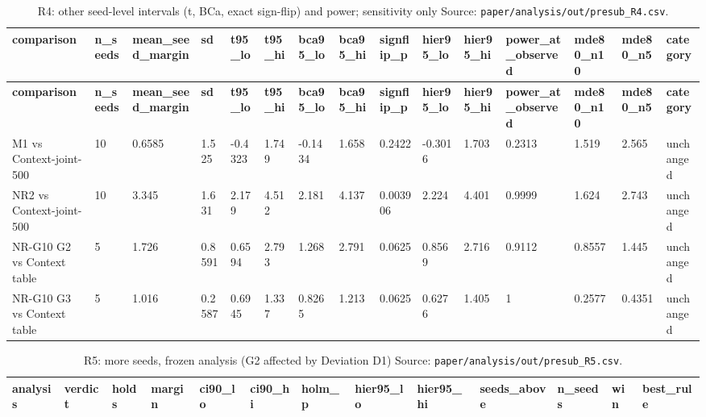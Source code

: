 \documentclass[10pt]{article}
\begin{document}
\begin{landscape}
\begin{longtable}{@{}llllllllllllll@{}}
\bottomrule
\end{longtable}
\normalsize
\tiny
\setlength{\tabcolsep}{2pt}
\begin{longtable}{@{}lllllllllllllll@{}}
\caption{R4: other seed-level intervals (t, BCa, exact sign-flip) and power; sensitivity only Source: \texttt{paper/analysis/out/presub\_R4.csv}.}\\
\toprule
\textbf{comparison} & \textbf{n\_seeds} & \textbf{mean\_seed\_margin} & \textbf{sd} & \textbf{t95\_lo} & \textbf{t95\_hi} & \textbf{bca95\_lo} & \textbf{bca95\_hi} & \textbf{signflip\_p} & \textbf{hier95\_lo} & \textbf{hier95\_hi} & \textbf{power\_at\_observed} & \textbf{mde80\_n10} & \textbf{mde80\_n5} & \textbf{category} \\
\midrule
\endfirsthead
\toprule
\textbf{comparison} & \textbf{n\_seeds} & \textbf{mean\_seed\_margin} & \textbf{sd} & \textbf{t95\_lo} & \textbf{t95\_hi} & \textbf{bca95\_lo} & \textbf{bca95\_hi} & \textbf{signflip\_p} & \textbf{hier95\_lo} & \textbf{hier95\_hi} & \textbf{power\_at\_observed} & \textbf{mde80\_n10} & \textbf{mde80\_n5} & \textbf{category} \\
\midrule
\endhead
M1 vs Context-joint-500 & 10 & 0.6585 & 1.525 & -0.4323 & 1.749 & -0.1434 & 1.658 & 0.2422 & -0.3016 & 1.703 & 0.2313 & 1.519 & 2.565 & unchanged \\
NR2 vs Context-joint-500 & 10 & 3.345 & 1.631 & 2.179 & 4.512 & 2.181 & 4.137 & 0.003906 & 2.224 & 4.401 & 0.9999 & 1.624 & 2.743 & unchanged \\
NR-G10 G2 vs Context table & 5 & 1.726 & 0.8591 & 0.6594 & 2.793 & 1.268 & 2.791 & 0.0625 & 0.8569 & 2.716 & 0.9112 & 0.8557 & 1.445 & unchanged \\
NR-G10 G3 vs Context table & 5 & 1.016 & 0.2587 & 0.6945 & 1.337 & 0.8265 & 1.213 & 0.0625 & 0.6276 & 1.405 & 1 & 0.2577 & 0.4351 & unchanged \\
\bottomrule
\end{longtable}
\normalsize
\tiny
\setlength{\tabcolsep}{2pt}
\begin{longtable}{@{}lllllllllllll@{}}
\caption{R5: more seeds, frozen analysis (G2 affected by Deviation D1) Source: \texttt{paper/analysis/out/presub\_R5.csv}.}\\
\toprule
\textbf{analysis} & \textbf{verdict} & \textbf{holds} & \textbf{margin} & \textbf{ci90\_lo} & \textbf{ci90\_hi} & \textbf{holm\_p} & \textbf{hier95\_lo} & \textbf{hier95\_hi} & \textbf{seeds\_above} & \textbf{n\_seeds} & \textbf{win} & \textbf{best\_rule} \\
\midrule

\end{longtable}
\end{landscape}
\end{document}
